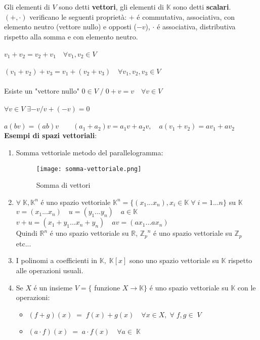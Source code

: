 \documentclass[12pt]{article}
\begin{document}
\noindent Gli elementi di $V$ sono detti \textbf{vettori}, gli elementi di $\mathbb{K}$ sono detti \textbf{scalari}.\\
$(+,\cdot)$ verificano le seguenti proprietà: $+$ é commutativa, associativa, con elemento neutro (vettore nullo) e opposti ($-v$), $\cdot$ é associativa, distributiva rispetto alla somma e con elemento neutro.\\\\
$v_1 + v_2 = v_2 + v_1 \quad \forall v_1,v_2 \in V$\\\\
$(v_1 + v_2)+v_3 = v_1+(v_2+v_3) \quad \forall v_1,v_2,v_3 \in V$\\\\
Esiste un "vettore nullo" $0 \in V \;/\; 0 + v = v \quad \forall v \in V$ \\\\
$\forall v \in  V \; \exists -v / v+(-v) = 0$\\\\
$a(bv) = (ab)v \quad\quad (a_1 + a_2)v = a_1v + a_2v, \quad a(v_1+v_2) = av_1 + av_2$\\

\noindent \textbf{Esempi di spazi vettoriali}:
\begin{enumerate}
    \item Somma vettoriale metodo del parallelogramma:\\
    \begin{figure}[h!]
        \centering
        \texttt{[image: somma-vettoriale.png]}
        \caption{Somma di vettori}
        
    \end{figure}
    
    \item $\forall \; \mathbb{K}, \mathbb{K}^{n}$ é uno spazio vettoriale $\mathbb{K}^{n} = \{(x_1...x_n), x_i \in \mathbb{K} \; \forall \;i=1...n\}$ su $\mathbb{K}$\\
    $v = (x_1...x_n) \quad u=(y_1...y_n)\quad a\in \mathbb{K}$\\
    $v+u = (x_1+y_1...x_n+y_n)\quad av=(ax_1...ax_n)$\\
    Quindi $\mathbb{R}^n$ é uno spazio vettoriale su $\mathbb{R}$, ${\mathbb{Z}_p}^{n}$  é uno spazio vettoriale su $\mathbb{Z}_p$ etc...
    \item I polinomi a coefficienti in $\mathbb{K}, \; \mathbb{K}[x] $ sono uno spazio vettoriale su $\mathbb{K}$ rispetto alle operazioni usuali.\\
    \item Se $X$ é un insieme $V =\{$ funzione $X \rightarrow \mathbb{K}\}$ é uno spazio vettoriale su $\mathbb{K}$ con le operazioni:
    \begin{itemize}
        \item $(f+g)(x) \;=\; f(x)+g(x) \quad \forall x \in X, \; \forall \;f,g \in \;V$
        \item $(a \cdot f)(x)\; = \; a \cdot f(x) \quad \forall a \in \; \mathbb{K}$
    \end{itemize}
\end{enumerate}
\end{document}
